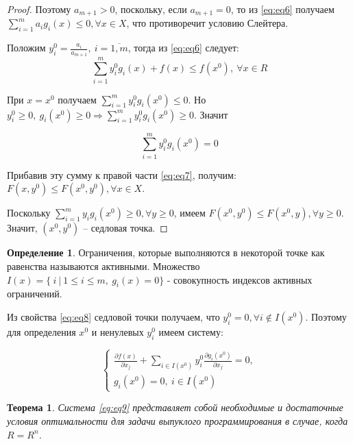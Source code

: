 \documentclass[12pt,a4paper,titlepage,oneside]{book}
\theoremstyle{definition}
\newtheorem{definition}{Определение}[chapter]
\theoremstyle{plain}
\newtheorem{theorem}{Теорема}[chapter]
\theoremstyle{remark}
\theoremstyle{remark}
\theoremstyle{plain}
\theoremstyle{plain}
\begin{document}
\begin{proof}
Поэтому $a_{m+1}>0$, поскольку, если $a_{m+1}=0$, то из \eqref{eq:eq6} получаем $\sum_{i=1}^m a_i g_i(x) \leqslant 0,\forall x \in X$, что противоречит условию Слейтера. \vspace{1ex}

Положим $\displaystyle y_i^0 = \frac{a_i}{a_{m+1}},~ i=\overline{1,m}$, тогда из \eqref{eq:eq6} следует: 
\begin{equation} \label{eq:eq7}
\sum_{i=1}^m y_i^0 g_i(x) + f(x) \leqslant f(x^0),~\forall x \in \textit{R}
\end{equation}

При $x = x^0$ получаем $\displaystyle  \sum_{i=1}^m y_i^0 g_i(x^0) \leqslant 0$. Но $\displaystyle y_i^0 \geqslant 0,~g_i(x^0) \geqslant 0 \Rightarrow \sum_{i=1}^m y_i^0 g_i(x^0) \geqslant 0$. Значит

\begin{equation} \label{eq:eq8}
\sum_{i=1}^m y_i^0 g_i(x^0) = 0
\end{equation}

Прибавив эту сумму к правой части \eqref{eq:eq7}, получим: $F(x,y^0) \leqslant F(x^0,y^0),\forall x \in X$.



Поскольку $\displaystyle  \sum_{i=1}^m y_i g_i(x^0) \geqslant 0, \forall y \geqslant 0$, имеем  $F(x^0,y^0) \leqslant F(x^0,y),\forall y \geqslant 0$. Значит, $(x^0,y^0)$ -- седловая точка.
\end{proof}

\begin{definition}
Ограничения, которые выполняются в некоторой точке как равенства называются активными. Множество $I(x) = \{~i~|~1\leqslant i \leqslant m,~g_i(x)=0\}$ - совокупность индексов активных ограничений.
\end{definition}

Из свойства \eqref{eq:eq8} седловой точки получаем, что $y_i^0 = 0, \forall i \notin I(x^0)$. Поэтому для определения $x^0$ и ненулевых $y_i^0$ имеем систему:

\begin{equation} \label{eq:eq9}
\begin{cases} 
\displaystyle \frac{\partial f(x)}{\partial x_j} + \sum_{i \in I(x^0)} y_i^0 \frac{\partial g_i(x^0)}{\partial x_j} = 0,\\[3ex]
g_i(x^0) = 0,~i \in I(x^0)
\end{cases}
\end{equation}

\begin{theorem}
Система \eqref{eq:eq9} представляет собой необходимые и достаточные условия оптимальности для задачи выпуклого программирования в случае, когда $R=\textit{R}^n$.
\end{theorem}
\end{document}

